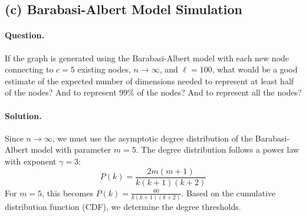 \documentclass[11pt]{article}
\begin{document}
\subsection*{(c) Barabasi-Albert Model Simulation}

\paragraph{Question.}
If the graph is generated using the Barabasi-Albert model with each new node connecting to $c=5$ existing nodes, $n \to \infty$, and $\ell=100$, what would be a good estimate of the expected number of dimensions needed to represent at least half of the nodes? And to represent 99\% of the nodes? And to represent all the nodes?

\paragraph{Solution.}
Since $n \to \infty$, we must use the asymptotic degree distribution of the Barabasi-Albert model with parameter $m=5$. The degree distribution follows a power law with exponent $\gamma=3$:
$$ P(k) = \frac{2m(m+1)}{k(k+1)(k+2)} $$
For $m=5$, this becomes $P(k) = \frac{60}{k(k+1)(k+2)}$.
Based on the cumulative distribution function (CDF), we determine the degree thresholds.
\end{document}
